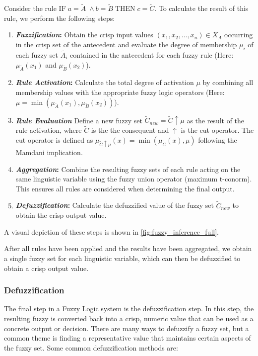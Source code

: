 Consider the rule $\text{IF} \; a = \tilde{A} \; \land b = \tilde{B} \; \text{THEN} \; c = \tilde{C}$. To calculate the result of this rule, we perform the following steps:

\begin{enumerate}
      \item \textbf{\emph{Fuzzification}:} Obtain the crisp input values $(x_1, x_2, \ldots, x_n) \in X_{A}$ occurring in the crisp set of the antecedent and evaluate the degree of membership $\mu_i$ of each fuzzy set $\tilde{A_i}$ contained in the antecedent for each fuzzy rule (Here: $\mu_{\tilde{A}}(x_1)$ and $\mu_{\tilde{B}}(x_2)$).
      \item \textbf{\emph{Rule Activation}:} Calculate the total degree of activation $\mu$ by combining all membership values with the appropriate fuzzy logic operators (Here: $\mu = \min(\mu_{\tilde{A}}(x_1), \mu_{\tilde{B}}(x_2))$).
      \item \textbf{\emph{Rule Evaluation}} Define a new fuzzy set $\tilde{C}_{new}=\tilde{C}\uparrow \mu$ as the result of the rule activation, where $\tilde{C}$ is the the consequent and $\uparrow$ is the cut operator. The cut operator is defined as $\mu_{\tilde{C}\uparrow \mu}(x) = \min(\mu_{\tilde{C}}(x), \mu)$ following the Mamdani implication.
      \item \textbf{\emph{Aggregation}:}  Combine the resulting fuzzy sets of each rule acting on the same linguistic variable using the fuzzy union operator (maximum t-conorm). This ensures all rules are considered when determining the final output.
      \item \textbf{\emph{Defuzzification}:} Calculate the defuzzified value of the fuzzy set $\tilde{C}_{new}$ to obtain the crisp output value.
\end{enumerate}

A visual depiction of these steps is shown in \autoref{fig:fuzzy_inference_full}.

\noindent After all rules have been applied and the results have been aggregated, we obtain a single fuzzy set for each linguistic variable, which can then be defuzzified to obtain a crisp output value.

\subsubsection{Defuzzification}

The final step in a Fuzzy Logic system is the defuzzification step. In this step, the resulting fuzzy is converted back into a crisp, numeric value that can be used as a concrete output or decision. There are many ways to defuzzify a fuzzy set, but a common theme is finding a representative value that maintains certain aspects of the fuzzy set. Some common defuzzification methods are:


